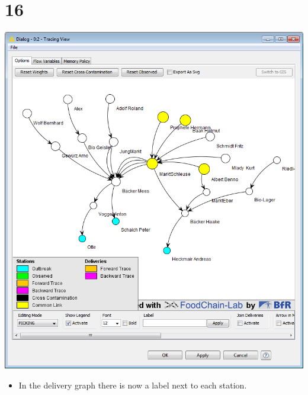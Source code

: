 \documentclass{beamer}
\begin{document}
\section{16}
\begin{frame}
	\begin{center}
  		\includegraphics[height=0.6\textheight]{16.png}
	\end{center}
	\begin{itemize}
		\item In the delivery graph there is now a label next to each station.
	\end{itemize}
\end{frame}
\end{document}
